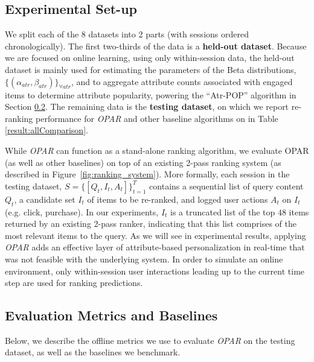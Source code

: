 \documentclass[11pt, dvipdfmx]{article}
\begin{document}
\subsection{Experimental Set-up}\label{subsec:experimental_setup}
We split each of the 8 datasets into 2 parts (with sessions ordered chronologically). The first two-thirds of the data is a \textbf{held-out dataset}. Because we are focused on online learning, using only within-session data, the held-out dataset is mainly used for estimating the parameters of the Beta distributions, $\{(\alpha_{atr}, \beta_{atr})\}_{\forall atr}$, and to aggregate attribute counts associated with engaged items to determine attribute popularity, powering the ``Atr-POP'' algorithm in Section \ref{sec:metrics_and_baselines}. 
The remaining data is the \textbf{testing dataset}, on which we report re-ranking performance for \emph{OPAR} and other baseline algorithms on in Table \ref{result:allComparison}. 

While \emph{OPAR} can function as a stand-alone ranking algorithm, we evaluate OPAR (as well as other baselines) on top of an existing 2-pass ranking system (as described in Figure~\ref{fig:ranking_system}). More formally, each session in the testing dataset, $S=\{{[Q_t, I_t, A_t]}\}_{t=1}^T$ contains a sequential list of query content $Q_t$, a candidate set $I_t$ of items to be re-ranked, and logged user actions $A_t$ on $I_t$ (e.g. click, purchase). In our experiments, $I_t$ is a truncated list of the top $48$ items returned by an existing 2-pass ranker, indicating that this list comprises of the most relevant items to the query. As we will see in experimental results, applying \emph{OPAR} adds an effective layer of attribute-based personalization in real-time that was not feasible with the underlying system. In order to simulate an online environment, only within-session user interactions leading up to the current time step are used for ranking predictions. 


\subsection{Evaluation Metrics and Baselines}\label{sec:metrics_and_baselines}
Below, we describe the offline metrics we use to evaluate \emph{OPAR} on the testing dataset, as well as the baselines we benchmark. 
\end{document}
